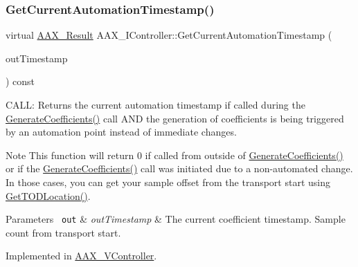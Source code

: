 \mbox{\label{a01789_af9ab9b228023e116f89249a56c27a20f}} 
\subsubsection{\texorpdfstring{GetCurrentAutomationTimestamp()}{GetCurrentAutomationTimestamp()}}
{\footnotesize\ttfamily virtual \mbox{\hyperlink{a00392_a4d8f69a697df7f70c3a8e9b8ee130d2f}{A\+A\+X\+\_\+\+Result}} A\+A\+X\+\_\+\+I\+Controller\+::\+Get\+Current\+Automation\+Timestamp (\begin{DoxyParamCaption}\item[{\mbox{\hyperlink{a00392_ac09cd6857748cc296ac0f8bcc20dc74b}{A\+A\+X\+\_\+\+C\+Transport\+Counter}} $\ast$}]{out\+Timestamp }\end{DoxyParamCaption}) const\hspace{0.3cm}{\ttfamily [pure virtual]}}



C\+A\+LL\+: Returns the current automation timestamp if called during the \mbox{\hyperlink{a01669_a083265b008921b6114ede387711694b7}{Generate\+Coefficients()}} call A\+ND the generation of coefficients is being triggered by an automation point instead of immediate changes. 

\begin{DoxyNote}{Note}
This function will return 0 if called from outside of \mbox{\hyperlink{a01669_a083265b008921b6114ede387711694b7}{Generate\+Coefficients()}} or if the \mbox{\hyperlink{a01669_a083265b008921b6114ede387711694b7}{Generate\+Coefficients()}} call was initiated due to a non-\/automated change. In those cases, you can get your sample offset from the transport start using \mbox{\hyperlink{a01789_afbc2973d755b6c3ae82b6c8461e9fdee}{Get\+T\+O\+D\+Location()}}.
\end{DoxyNote}

\begin{DoxyParams}[1]{Parameters}
\mbox{\texttt{ out}}  & {\em out\+Timestamp} & The current coefficient timestamp. Sample count from transport start. \\
\hline
\end{DoxyParams}


Implemented in \mbox{\hyperlink{a01905_affb116c9d90b03aa974ad238d4690e22}{A\+A\+X\+\_\+\+V\+Controller}}.

